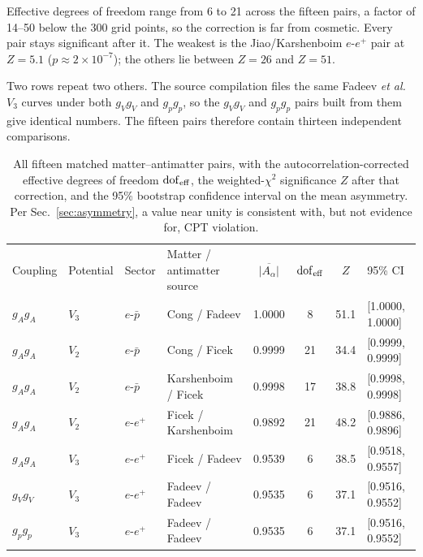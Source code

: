 \documentclass[
  aps,
  prd,
  reprint,
  amsmath,
  amssymb,
  nofootinbib,
  superscriptaddress,
  floatfix
]{revtex4-2}
\newcommand{\Aalpha}{A_\alpha}
\begin{document}
Effective degrees of freedom range from 6 to 21 across the fifteen pairs, a
factor of 14--50 below the 300 grid points, so the correction is far from
cosmetic. Every pair stays significant after it. The weakest is the
Jiao/Karshenboim $e$-$e^+$ pair at $Z=5.1$ ($p\approx2\times10^{-7}$); the
others lie between $Z=26$ and $Z=51$.

Two rows repeat two others. The source compilation files the same Fadeev
\textit{et al.}\ $V_3$ curves under both $g_Vg_V$ and $g_pg_p$, so the
$g_Vg_V$ and $g_pg_p$ pairs built from them give identical numbers. The
fifteen pairs therefore contain thirteen independent comparisons.

\begin{table}[t]
\caption{\label{tab:pairs}%
All fifteen matched matter--antimatter pairs, with the
autocorrelation-corrected effective degrees of freedom
$\mathrm{dof}_{\rm eff}$, the weighted-$\chi^2$ significance $Z$ after that
correction, and the 95\% bootstrap confidence interval on the mean
asymmetry. Per Sec.~\ref{sec:asymmetry}, a value near unity is consistent
with, but not evidence for, CPT violation.}
\begin{ruledtabular}
\begin{tabular}{lllldccl}
Coupling & Potential & Sector & Matter / antimatter source &
\multicolumn{1}{c}{$\overline{|\Aalpha|}$} & $\mathrm{dof}_{\rm eff}$ &
$Z$ & 95\% CI \\
\colrule
$g_Ag_A$ & $V_3$ & $e$-$\bar p$ & Cong \cite{Cong2025b} / Fadeev \cite{Fadeev2022} & 1.0000 & 8 & 51.1 & [1.0000, 1.0000] \\
$g_Ag_A$ & $V_2$ & $e$-$\bar p$ & Cong \cite{Cong2025b} / Ficek \cite{Ficek2018} & 0.9999 & 21 & 34.4 & [0.9999, 0.9999] \\
$g_Ag_A$ & $V_2$ & $e$-$\bar p$ & Karshenboim \cite{Karshenboim2011} / Ficek \cite{Ficek2018} & 0.9998 & 17 & 38.8 & [0.9998, 0.9998] \\
$g_Ag_A$ & $V_2$ & $e$-$e^+$ & Ficek \cite{Ficek2017} / Karshenboim \cite{Karshenboim2011} & 0.9892 & 21 & 48.2 & [0.9886, 0.9896] \\
$g_Ag_A$ & $V_3$ & $e$-$e^+$ & Ficek \cite{Ficek2017} / Fadeev \cite{Fadeev2022} & 0.9539 & 6 & 38.5 & [0.9518, 0.9557] \\
$g_Vg_V$ & $V_3$ & $e$-$e^+$ & Fadeev \cite{Fadeev2022} / Fadeev \cite{Fadeev2022} & 0.9535 & 6 & 37.1 & [0.9516, 0.9552] \\
$g_pg_p$ & $V_3$ & $e$-$e^+$ & Fadeev \cite{Fadeev2022} / Fadeev \cite{Fadeev2022} & 0.9535 & 6 & 37.1 & [0.9516, 0.9552] \\

\end{tabular}
\end{ruledtabular}
\end{table}
\end{document}
